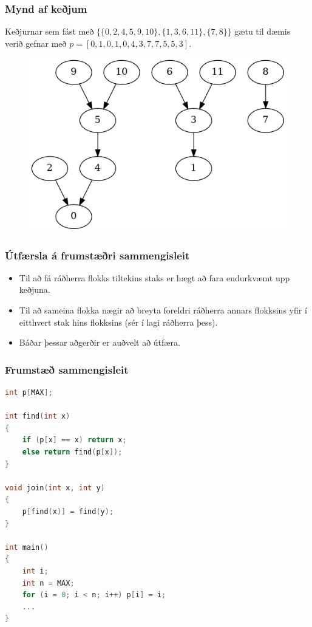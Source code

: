 \documentclass{beamer}
\begin{document}
\begin{frame}
\frametitle{Mynd af keðjum}
	Keðjurnar sem fást með $\{\{0, 2, 4, 5, 9, 10\}, \{1, 3, 6, 11\}, \{7, 8\}\}$ gætu til dæmis verið
	gefnar með $p = [0, 1, 0, 1, 0, 4, 3, 7, 7, 5, 5, 3]$.
	\begin{figure}
	\item<2->
		\includegraphics[scale=0.5]{mynd.png}
	\end{figure}
\end{frame}

\begin{frame}
\frametitle{Útfærsla á frumstæðri sammengisleit}
\begin{itemize}
	\item<1-> Til að fá ráðherra flokks tiltekins staks er hægt að fara endurkvæmt upp keðjuna.
	\item<2-> Til að sameina flokka nægir að breyta foreldri ráðherra annars flokksins yfir í
		eitthvert stak hins flokksins (sér í lagi ráðherra þess).
	\item<3-> Báðar þessar aðgerðir er auðvelt að útfæra.
\end{itemize}
\end{frame}

\begin{frame}[fragile]
	\frametitle{Frumstæð sammengisleit}
\tiny
\begin{lstlisting}[language=C++]
int p[MAX];

int find(int x)
{
	if (p[x] == x) return x;
	else return find(p[x]);
}

void join(int x, int y)
{
	p[find(x)] = find(y);
}

int main()
{
	int i;
	int n = MAX;
	for (i = 0; i < n; i++) p[i] = i;
	...
}
\end{lstlisting}
\end{frame}
\end{document}
